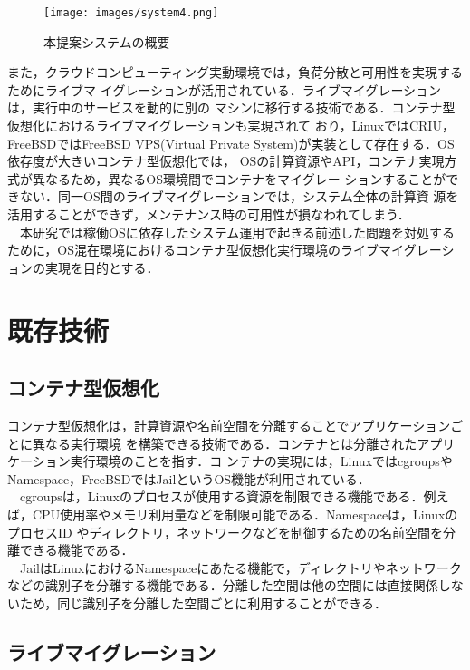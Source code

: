 \documentclass[11pt]{jarticle}
\begin{document}
\begin{figure*}[t]
  \centering
  \texttt{[image: images/system4.png]} \\
  \caption{本提案システムの概要}
  \label{fig:system}
\end{figure*}

また，クラウドコンピューティング実動環境では，負荷分散と可用性を実現するためにライブマ
イグレーションが活用されている．ライブマイグレーションは，実行中のサービスを動的に別の
マシンに移行する技術である．コンテナ型仮想化におけるライブマイグレーションも実現されて
おり，LinuxではCRIU\cite{criu,container_live}，FreeBSDではFreeBSD VPS(Virtual Private
 System)\cite{freebsd-vps}が実装として存在する．OS依存度が大きいコンテナ型仮想化では，
 OSの計算資源やAPI，コンテナ実現方式が異なるため，異なるOS環境間でコンテナをマイグレー
 ションすることができない．同一OS間のライブマイグレーションでは，システム全体の計算資
 源を活用することができず，メンテナンス時の可用性が損なわれてしまう．\\
　本研究では稼働OSに依存したシステム運用で起きる前述した問題を対処するために，OS混在環境におけるコンテナ型仮想化実行環境のライブマイグレーションの実現を目的とする．

\section{既存技術}
\subsection{コンテナ型仮想化}
\label{sec:container}

コンテナ型仮想化は，計算資源や名前空間を分離することでアプリケーションごとに異なる実行環境
を構築できる技術である．コンテナとは分離されたアプリケーション実行環境のことを指す．コ
ンテナの実現には，LinuxではcgroupsやNamespace，FreeBSDではJailというOS機能が利用されている．\\
　cgroupsは，Linuxのプロセスが使用する資源を制限できる機能である．例えば，CPU使用率やメモリ利用量などを制限可能である．Namespaceは，LinuxのプロセスID
やディレクトリ，ネットワークなどを制御するための名前空間を分離できる機能である．\\
　JailはLinuxにおけるNamespaceにあたる機能で，ディレクトリやネットワークなどの識別子を分離する機能である．分離した空間は他の空間には直接関係しないため，同じ識別子を分離した空間ごとに利用することができる．

\subsection{ライブマイグレーション}
\end{document}
